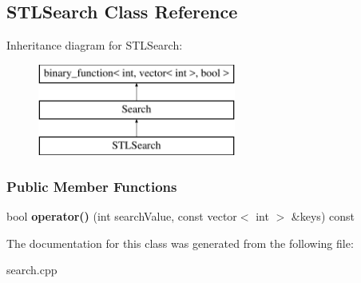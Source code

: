 \hypertarget{class_s_t_l_search}{}\subsection{S\+T\+L\+Search Class Reference}
\label{class_s_t_l_search}
Inheritance diagram for S\+T\+L\+Search\+:\begin{figure}[H]
\begin{center}
\leavevmode
\includegraphics[height=3.000000cm]{class_s_t_l_search}
\end{center}
\end{figure}
\subsubsection*{Public Member Functions}
\begin{DoxyCompactItemize}
\item 
bool {\bfseries operator()} (int search\+Value, const vector$<$ int $>$ \&keys) const \hypertarget{class_s_t_l_search_a0f3684e33bd5e47317ab5a94d6f52dba}{}\label{class_s_t_l_search_a0f3684e33bd5e47317ab5a94d6f52dba}

\end{DoxyCompactItemize}


The documentation for this class was generated from the following file\+:\begin{DoxyCompactItemize}
\item 
search.\+cpp\end{DoxyCompactItemize}
